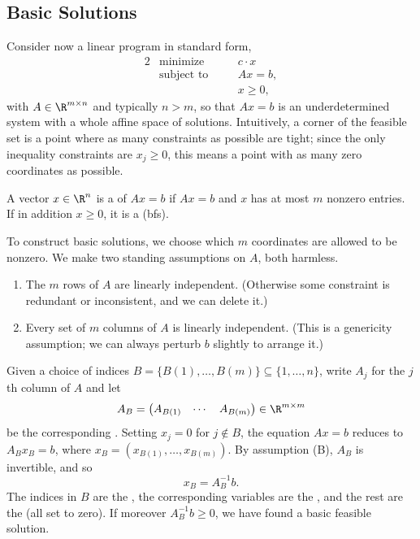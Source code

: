 \documentclass[a4paper]{scrartcl}
\begin{document}
\subsection{Basic Solutions}

Consider now a linear program in standard form,
\begin{alignat*}{2}
    & \text{minimize} \quad && c \cdot x \\
    & \text{subject to} \quad && Ax = b, \\
    & && x \geq 0,
\end{alignat*}
with $A \in \R^{m \times n}$ and typically $n > m$, so that $Ax = b$ is an underdetermined system with a whole affine space of solutions. Intuitively, a corner of the feasible set is a point where as many constraints as possible are tight; since the only inequality constraints are $x_j \geq 0$, this means a point with as many zero coordinates as possible.

\begin{definition}
    A vector $x \in \R^n$ is a  of $Ax = b$ if $Ax = b$ and $x$ has at most $m$ nonzero entries. If in addition $x \geq 0$, it is a  (bfs).
\end{definition}

To construct basic solutions, we choose which $m$ coordinates are allowed to be nonzero. We make two standing assumptions on $A$, both harmless.
\begin{enumerate}[label=(\Alph*)]
    \item The $m$ rows of $A$ are linearly independent. (Otherwise some constraint is redundant or inconsistent, and we can delete it.)
    \item Every set of $m$ columns of $A$ is linearly independent. (This is a genericity assumption; we can always perturb $b$ slightly to arrange it.)
\end{enumerate}

Given a choice of indices $B = \{B(1), \dots, B(m)\} \subseteq \{1, \dots, n\}$, write $A_j$ for the $j$th column of $A$ and let
$$
A_B = \begin{pmatrix} A_{B(1)} & \cdots & A_{B(m)}\end{pmatrix} \in \R^{m\times m}
$$
be the corresponding . Setting $x_j = 0$ for $j \notin B$, the equation $Ax = b$ reduces to $A_B x_B = b$, where $x_B = (x_{B(1)}, \dots, x_{B(m)})$. By assumption (B), $A_B$ is invertible, and so
$$
x_B = A_B^{-1}b.
$$
The indices in $B$ are the , the corresponding variables are the , and the rest are the  (all set to zero). If moreover $A_B^{-1}b \geq 0$, we have found a basic feasible solution.
\end{document}
